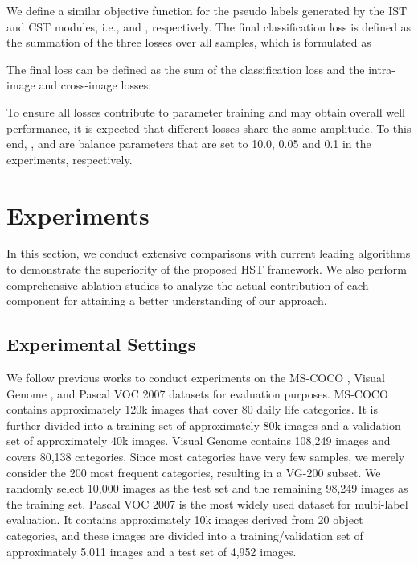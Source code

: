 We define a similar objective function for the pseudo labels generated by the IST and CST modules, i.e.,  and , respectively. The final classification loss is defined as the summation of the three losses over all samples, which is formulated as

The final loss can be defined as the sum of the classification loss and the intra-image and cross-image losses:

To ensure all losses contribute to parameter training and may obtain overall well performance, it is expected that different losses share the same amplitude. To this end, ,  and  are balance parameters that are set to 10.0, 0.05 and 0.1 in the experiments, respectively.

\section{Experiments}
\label{sec:exp}
In this section, we conduct extensive comparisons with current leading algorithms to demonstrate the superiority of the proposed HST framework. We also perform comprehensive ablation studies to analyze the actual contribution of each component for attaining a better understanding of our approach.

\subsection{Experimental Settings}

\quad We follow previous works \cite{durand2019learning} to conduct experiments on the MS-COCO \cite{lin2014microsoft}, Visual Genome \cite{krishna2017visual}, and Pascal VOC 2007 \cite{everingham2010pascal} datasets for evaluation purposes. MS-COCO contains approximately 120k images that cover 80 daily life categories. It is further divided into a training set of approximately 80k images and a validation set of approximately 40k images. Visual Genome contains 108,249 images and covers 80,138 categories. Since most categories have very few samples, we merely consider the 200 most frequent categories, resulting in a VG-200 subset. We randomly select 10,000 images as the test set and the remaining 98,249 images as the training set. Pascal VOC 2007 is the most widely used dataset for multi-label evaluation. It contains approximately 10k images derived from 20 object categories, and these images are divided into a training/validation set of approximately 5,011 images and a test set of 4,952 images.

